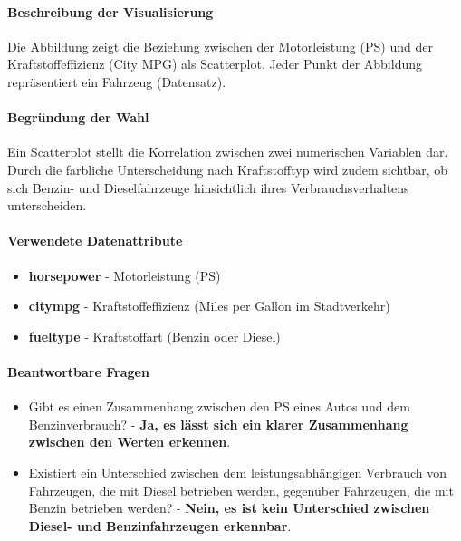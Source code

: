 \documentclass[a4paper,12pt]{article}
\begin{document}
\paragraph{Beschreibung der Visualisierung} \break
Die Abbildung zeigt die Beziehung zwischen der Motorleistung (PS) und der Kraftstoffeffizienz (City MPG) als Scatterplot.
Jeder Punkt der Abbildung repräsentiert ein Fahrzeug (Datensatz).

\hfill \break

\paragraph{Begründung der Wahl}
Ein Scatterplot stellt die Korrelation zwischen zwei numerischen Variablen dar.
Durch die farbliche Unterscheidung nach Kraftstofftyp wird zudem sichtbar, ob sich Benzin- und Dieselfahrzeuge hinsichtlich ihres Verbrauchsverhaltens unterscheiden.

\paragraph{Verwendete Datenattribute}
\begin{itemize}
  \item \textbf{horsepower} - Motorleistung (PS)
  \item \textbf{citympg} - Kraftstoffeffizienz (Miles per Gallon im Stadtverkehr)
  \item \textbf{fueltype} - Kraftstoffart (Benzin oder Diesel)
\end{itemize}


\paragraph{Beantwortbare Fragen}
\begin{itemize}
  \item Gibt es einen Zusammenhang zwischen den PS eines Autos und dem Benzinverbrauch? - 
    \textbf{Ja, es lässt sich ein klarer Zusammenhang zwischen den Werten erkennen}.
  \item Existiert ein Unterschied zwischen dem leistungsabhängigen Verbrauch von Fahrzeugen, die mit Diesel betrieben werden, gegenüber
    Fahrzeugen, die mit Benzin betrieben werden? - \textbf{Nein, es ist kein Unterschied zwischen Diesel- und Benzinfahrzeugen erkennbar}.
\end{itemize}


\end{document}
